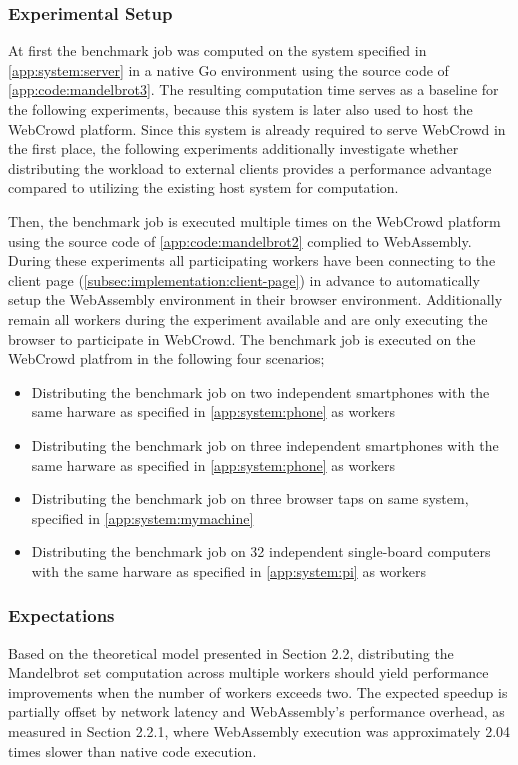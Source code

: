\subsubsection{Experimental Setup}
At first the benchmark job was computed on the system specified in \autoref{app:system:server} in a native Go environment using the source code of \autoref{app:code:mandelbrot3}. The resulting computation time serves as a baseline for the following experiments, because this system is later also used to host the WebCrowd platform. Since this system is already required to serve WebCrowd in the first place, the following experiments additionally investigate whether distributing the workload to external clients provides a performance advantage compared to utilizing the existing host system for computation.

Then, the benchmark job is executed multiple times on the WebCrowd platform using the source code of \autoref{app:code:mandelbrot2} complied to WebAssembly. During these experiments all participating workers have been connecting to the client page (\autoref{subsec:implementation:client-page}) in advance to automatically setup the WebAssembly environment in their browser environment. Additionally remain all workers during the experiment available and are only executing the browser to participate in WebCrowd. The benchmark job is executed on the WebCrowd platfrom in the following four scenarios;
\begin{itemize}
    \item Distributing the benchmark job on two independent smartphones with the same harware as specified in \autoref{app:system:phone} as workers
    \item Distributing the benchmark job on three independent smartphones with the same harware as specified in \autoref{app:system:phone} as workers
    \item Distributing the benchmark job on three browser taps on same system, specified in \autoref{app:system:mymachine}
    \item Distributing the benchmark job on 32 independent single-board computers with the same harware as specified in \autoref{app:system:pi} as workers
\end{itemize}

\subsubsection{Expectations}
Based on the theoretical model presented in Section 2.2, distributing the Mandelbrot set computation across multiple workers should yield performance improvements when the number of workers exceeds two. The expected speedup is partially offset by network latency and WebAssembly's performance overhead, as measured in Section 2.2.1, where WebAssembly execution was approximately 2.04 times slower than native code execution.

